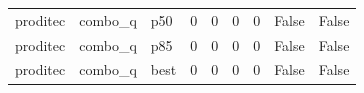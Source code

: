 \begin{tabular}{lllrrrrll}
proditec &              combo\_q &    p50 &                   0 &                 0 &                    0 &                            0 &                                        False &                                False \\
proditec &              combo\_q &    p85 &                   0 &                 0 &                    0 &                            0 &                                        False &                                False \\
proditec &              combo\_q &   best &                   0 &                 0 &                    0 &                            0 &                                        False &                                False \\
\bottomrule
\end{tabular}
